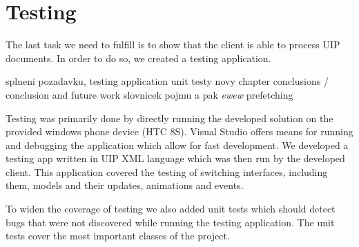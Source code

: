 \chapter{Testing}
The last task we need to fulfill is to show that the client is able to process UIP documents. In order to do so, we created a testing application.

splneni pozadavku,
testing application
unit testy
novy chapter conclusions / conclusion and future work
slovnicek pojmu a pak \emph{ewew}
prefetching

Testing was primarily done by directly running the developed solution on the provided windows phone device (HTC 8S). Visual Studio offers means for running and debugging the application which allow for fast development. 
We developed a testing app written in UIP XML language which was then run by the developed client. This application covered the testing of switching interfaces, including them, models and their updates, animations and events.

To widen the coverage of testing we also added unit tests which should detect bugs that were not discovered while running the testing application. The unit tests cover the most important classes of the project.
